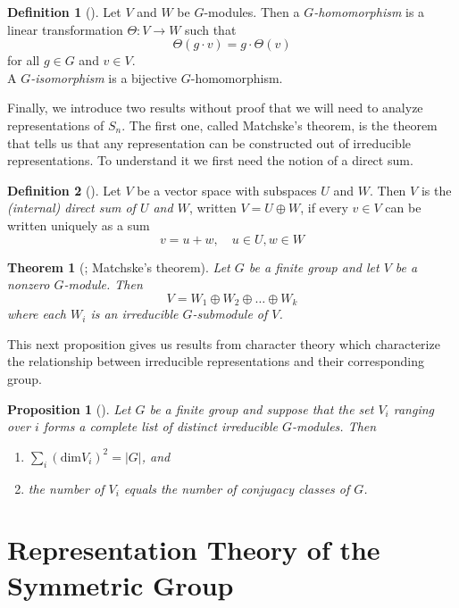 \documentclass[12pt,twoside]{reedthesis}
\theoremstyle{plain}   %
\newtheorem{thm}{Theorem}[section] %
\newtheorem{prop}{Proposition}[section]
\theoremstyle{definition}
\newtheorem{defn}{Definition}[section]
\theoremstyle{remark}
\numberwithin{equation}{section}
\def\dim{\mathrm{dim}}
\begin{document}
   \begin{defn}[{\cite[Definition 1.6.1]{sagan}}]
     Let $V$ and $W$ be $G$-modules. Then a \emph{$G$-homomorphism} is a linear transformation $\Theta: V \to W$ such that
     \[\Theta(g \cdot v) = g \cdot \Theta(v)\]
     for all $g \in G$ and $v \in V$.\\
     A \emph{$G$-isomorphism} is a bijective $G$-homomorphism.
   \end{defn}
   
   Finally, we introduce two results without proof that we will need to analyze representations of $S_n$. The first one, called
   Matchske's theorem, is the theorem that tells us that any representation can be constructed out of irreducible representations.
   To understand it we first need the notion of a direct sum.
   \begin{defn}[{\cite[Definition 1.5.1]{sagan}}]
     Let $V$ be a vector space with subspaces $U$ and $W$.
     Then $V$ is the \emph{(internal) direct sum of $U$ and $W$}, written $V = U \oplus W$, if every $v \in V$ can be
     written uniquely as a sum
     \[v= u +w, \quad u \in U, w \in W\]
   \end{defn}
   \begin{thm}[{\cite[Theorem 1.5.3]{sagan}; Matchske's theorem}]
     Let $G$ be a finite group and let $V$ be a nonzero $G$-module. Then
     \[ V = W_1 \oplus W_2 \oplus \dots \oplus W_k\]
     where each $W_i$ is an irreducible $G$-submodule of $V$.
   \end{thm}
   
   This next proposition gives us results from character theory which characterize the relationship between irreducible representations
   and their corresponding group.
   
   \begin{prop}[{\cite[Proposition 1.10.1]{sagan}}]
     Let $G$ be a finite group and suppose that the set $V_i$ ranging over $i$ forms a complete list of
     distinct irreducible $G$-modules. Then
     \begin{enumerate}
     \item $\sum_i (\dim V_i)^2 = |G|$, and
     \item the number of $V_i$ equals the number of conjugacy classes of $G$.
     \end{enumerate}
   \end{prop}   
   

   \section{Representation Theory of the Symmetric Group}
\end{document}
